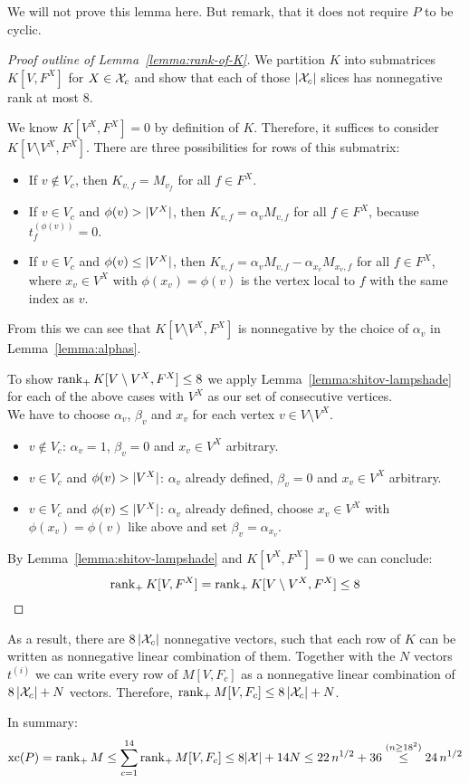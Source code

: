 We will not prove this lemma here. But remark, that it does not require $P$ to be cyclic.

\begin{proof}[Proof outline of Lemma~\ref{lemma:rank-of-K}]
  We partition $K$ into submatrices $K[V,F^X]$ for $X \in \mathcal{X}_c$ and show that each of those $\lvert\mathcal{X}_c\rvert$ slices has nonnegative rank at most $8$.

  We know $K[V^X,F^X] = 0$ by definition of $K$. Therefore, it suffices to consider $K[V \setminus V^X, F^X]$. There are three possibilities for rows of this submatrix:

  \begin{itemize}
    \item If $v \notin V_c$, then $K_{v,f} = M_{v_f}$ for all $f \in F^X$.
    \item If $v \in V_c$ and $\phi(v) > \lvert V^X\rvert$, then $K_{v,f} = \alpha_v M_{v,f}$ for all $f \in F^X$, because $t_f^{(\phi(v))} = 0$.
    \item If $v \in V_c$ and $\phi(v) \leq \lvert V^X\rvert$, then $K_{v,f} = \alpha_v M_{v,f} - \alpha_{x_v} M_{x_v,f}$ for all $f \in F^X$, where $x_v \in V^X$ with $\phi(x_v) = \phi(v)$ is the vertex local to $f$ with the same index as $v$.
  \end{itemize}

  From this we can see that $K[V \setminus V^X, F^X]$ is nonnegative by the choice of $\alpha_v$ in Lemma~\ref{lemma:alphas}.

  To show $\operatorname{rank}_+ K[V \setminus V^X, F^X] \leq 8$ we apply Lemma~\ref{lemma:shitov-lampshade} for each of the above cases with $V^X$ as our set of consecutive vertices.\\
  We have to choose $\alpha_v$, $\beta_v$ and $x_v$ for each vertex $v \in V \setminus V^X$.

  \begin{itemize}
    \item $v \notin V_c$: $\alpha_v = 1$, $\beta_v = 0$ and $x_v \in V^X$ arbitrary.
    \item $v \in V_c$ and $\phi(v) > \lvert V^X\rvert$: $\alpha_v$ already defined, $\beta_v = 0$ and $x_v \in V^X$ arbitrary.
    \item $v \in V_c$ and $\phi(v) \leq \lvert V^X\rvert$: $\alpha_v$ already defined, choose $x_v \in V^X$ with $\phi(x_v) = \phi(v)$ like above and set $\beta_v = \alpha_{x_v}$.
  \end{itemize}

  By Lemma~\ref{lemma:shitov-lampshade} and $K[V^X,F^X] = 0$ we can conclude: $$\operatorname{rank}_+ K[V,F^X] = \operatorname{rank}_+ K[V \setminus V^X,F^X] \leq 8$$
\end{proof}

As a result, there are $8\,\lvert\mathcal{X}_c\rvert$ nonnegative vectors, such that each row of $K$ can be written as nonnegative linear combination of them. Together with the $N$ vectors $t^{(i)}$ we can write every row of $M[V,F_c]$ as a nonnegative linear combination of $8\,\lvert\mathcal{X}_c\rvert + N$ vectors. Therefore, $\operatorname{rank}_+ M[V,F_c] \leq 8\,\lvert\mathcal{X}_c\rvert + N$.

In summary: $$\operatorname{xc}(P) = \operatorname{rank}_+ M \leq \sum_{c=1}^{14} \operatorname{rank}_+ M[V,F_c] \leq 8\lvert\mathcal{X}\rvert + 14N \leq 22\,n^{1/2} + 36 \stackrel{(n \geq 18^2)}{\leq} 24\,n^{1/2}$$
